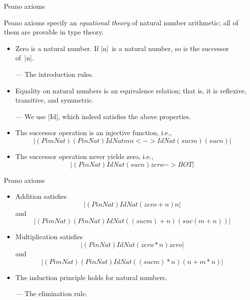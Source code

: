 \documentclass[t,compress,hyperref={hidelinks}]{beamer}
\begin{document}
\begin{frame}{Peano axioms}

Peano axioms specify an \emph{equational theory} of natural number arithmetic; all of them are provable in type theory.

\begin{itemize}

\item Zero is a natural number. If |n|~is a natural number, so is the successor of~|n|.

\quad --- The introduction rules.

\item Equality on natural numbers is an equivalence relation; that is, it is reflexive, transitive, and symmetric.

\quad --- We use |Id|, which indeed satisfies the above properties.

\item The successor operation is an injective function, i.e.,
\[ |(Pi m Nat) (Pi n Nat) Id Nat m n <-> Id Nat (suc m) (suc n)| \]

\item The successor operation never yields zero, i.e.,
\[ |(Pi n Nat) Id Nat (suc n) zero -> BOT| \]

\end{itemize}

\end{frame}

\begin{frame}{Peano axioms}

\begin{itemize}

\item Addition satisfies
\[ |(Pi n Nat) Id Nat (zero + n) n| \]
and
\[ |(Pi m Nat) (Pi n Nat) Id Nat ((suc m) + n) (suc (m + n))| \]

\item Multiplication satisfies
\[ |(Pi n Nat) Id Nat (zero * n) zero| \]
and
\[ |(Pi m Nat) (Pi n Nat) Id Nat ((suc m) * n) (n + m * n)| \]

\item The induction principle holds for natural numbers.

\quad --- The elimination rule.

\end{itemize}

\end{frame}
\end{document}

